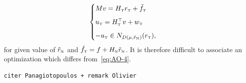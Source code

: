 \begin{equation}\label{eq:soccp1-tangent}
  \begin{cases}
    M v = {H_\t} {r_\t} + {\tilde f_\t} \\[2mm]
    u_\t = H_\t^\top v + w_\t \\[2mm]
    -u_\t \in N_{D(\mu,\tilde r_{\n})}(r_\t),
  \end{cases}
\end{equation}
for  given value of  $\tilde r_{\hbox{\tiny{N}}}$ and $\tilde f_{\hbox{\tiny{T}}} = f + H_{\hbox{\tiny{N}}} \tilde r_{\hbox{\tiny{N}}}$. It is therefore difficult to associate an optimization which differs from~\eqref{eq:AO-4}.  



\texttt{citer Panagiotopoulos + remark Olivier}

